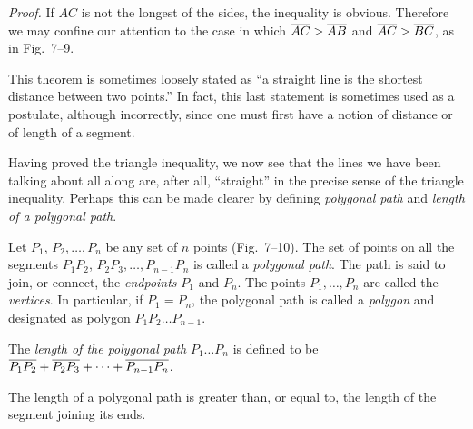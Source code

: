 \documentclass[11pt]{book}
\begin{document}
\FIGVIININETEN

\noindent\emph{Proof.}\quad
If $AC$ is not the longest of the sides, the inequality is obvious. Therefore
we may confine our attention to the case in which $\overline{AC} > \overline{AB}$ and
$\overline{AC} > \overline{BC}$, as in Fig.~7--9.

\begin{steps}
\end{steps}

\begin{remark}
This theorem is sometimes loosely stated as ``a straight line is the shortest
distance between two points.'' In fact, this last statement is sometimes used
as a postulate, although incorrectly, since one must first have a notion of
distance or of length of a segment.
\end{remark}

Having proved the triangle inequality, we now see that the lines we have been
talking about all along are, after all, ``straight'' in the precise sense of
the triangle inequality. Perhaps this can be made clearer by defining
\emph{polygonal path} and \emph{length of a polygonal path}.

\begin{definition}
Let $P_1$, $P_2,\ldots, P_n$ be any set of $n$ points (Fig.~7--10). The set of
points on all the segments $P_1P_2$, $P_2P_3,\ldots, P_{n-1}P_n$ is called a
\emph{polygonal path}. The path is said to join, or connect, the
\emph{endpoints} $P_1$ and $P_n$. The points $P_1,\ldots, P_n$ are called the
\emph{vertices}. In particular, if $P_1 = P_n$, the polygonal path is called a
\emph{polygon} and designated as polygon $P_1P_2\ldots P_{n-1}$.
\end{definition}

\begin{definition}
The \emph{length of the polygonal path} $P_1\ldots P_n$ is defined to be
$\overline{P_1P_2} + \overline{P_2P_3} + \cdots + \overline{P_{n-1}P_n}$.
\end{definition}

\begin{corollary}
The length of a polygonal path is greater than, or equal to, the length of the
segment joining its ends.
\end{corollary}
\end{document}

